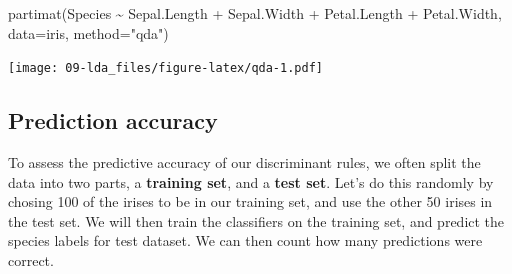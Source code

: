 \documentclass[
]{book}
\newenvironment{Shaded}{\begin{snugshade}}{\end{snugshade}}
\newcommand{\AttributeTok}[1]{\textcolor[rgb]{0.77,0.63,0.00}{#1}}
\newcommand{\DecValTok}[1]{\textcolor[rgb]{0.00,0.00,0.81}{#1}}
\newcommand{\FunctionTok}[1]{\textcolor[rgb]{0.00,0.00,0.00}{#1}}
\newcommand{\NormalTok}[1]{#1}
\newcommand{\OtherTok}[1]{\textcolor[rgb]{0.56,0.35,0.01}{#1}}
\newcommand{\SpecialCharTok}[1]{\textcolor[rgb]{0.00,0.00,0.00}{#1}}
\newcommand{\StringTok}[1]{\textcolor[rgb]{0.31,0.60,0.02}{#1}}
\theoremstyle{definition}
\theoremstyle{definition}
\theoremstyle{definition}
\theoremstyle{definition}
\theoremstyle{remark}
\begin{document}
\begin{Shaded}
\begin{Highlighting}[]
\FunctionTok{partimat}\NormalTok{(Species }\SpecialCharTok{\textasciitilde{}}\NormalTok{ Sepal.Length }\SpecialCharTok{+}\NormalTok{ Sepal.Width }\SpecialCharTok{+}\NormalTok{ Petal.Length }\SpecialCharTok{+} 
\NormalTok{           Petal.Width,         }\AttributeTok{data=}\NormalTok{iris, }\AttributeTok{method=}\StringTok{"qda"}\NormalTok{)}
\end{Highlighting}
\end{Shaded}

\texttt{[image: 09-lda\_files/figure-latex/qda-1.pdf]}

\hypertarget{prediction-accuracy}{%
\subsection{Prediction accuracy}\label{prediction-accuracy}}

To assess the predictive accuracy of our discriminant rules, we often split the data into two parts, a \textbf{training set}, and a \textbf{test set}. Let's do this randomly by chosing 100 of the irises to be in our training set, and use the other 50 irises in the test set. We will then train the classifiers on the training set, and predict the species labels for test dataset. We can then count how many predictions were correct.

\begin{Shaded}
\end{Shaded}
\end{document}
